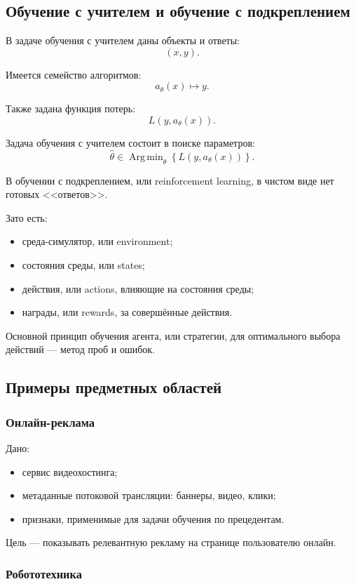 \documentclass[12pt,a4paper]{article}
\DeclareMathOperator*{\Argmin}{Arg\,min}
\begin{document}
\subsection{Обучение с учителем и обучение с подкреплением}

В задаче обучения с учителем даны объекты и ответы:
\[
(x,y).
\]

Имеется семейство алгоритмов:
\[
a_\theta(x) \mapsto y.
\]

Также задана функция потерь:
\[
L(y,a_\theta(x)).
\]

Задача обучения с учителем состоит в поиске параметров:
\[
\hat\theta
\in
\Argmin_{\theta}
\left\{
L(y,a_\theta(x))
\right\}.
\]

В обучении с подкреплением, или reinforcement learning, в чистом виде нет готовых <<ответов>>.

Зато есть:
\begin{itemize}
    \item среда-симулятор, или environment;
    \item состояния среды, или states;
    \item действия, или actions, влияющие на состояния среды;
    \item награды, или rewards, за совершённые действия.
\end{itemize}

Основной принцип обучения агента, или стратегии, для оптимального выбора действий --- метод проб и ошибок.

\subsection{Примеры предметных областей}

\subsubsection{Онлайн-реклама}

Дано:
\begin{itemize}
    \item сервис видеохостинга;
    \item метаданные потоковой трансляции: баннеры, видео, клики;
    \item признаки, применимые для задачи обучения по прецедентам.
\end{itemize}

Цель --- показывать релевантную рекламу на странице пользователю онлайн.

\subsubsection{Робототехника}
\end{document}
